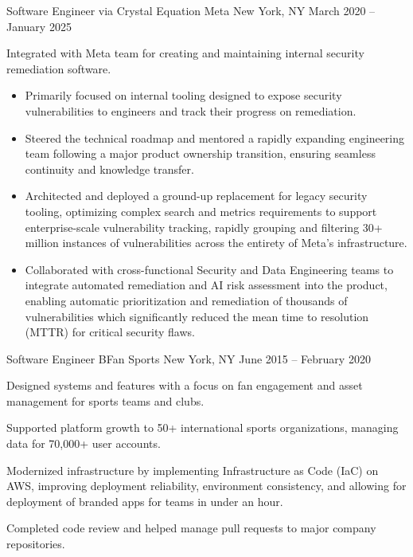 \begin{cventries}
	\cventry
		{Software Engineer via Crystal Equation} %
		{Meta} %
		{New York, NY} %
		{March 2020 – January 2025} %
		{
			\begin{cvitems} %
				\item {Integrated with Meta team for creating and maintaining internal security remediation software.}
				\begin{itemize}
					\item {Primarily focused on internal tooling designed to expose security vulnerabilities to engineers and track their progress on remediation.}
					\item {Steered the technical roadmap and mentored a rapidly expanding engineering team following a major product ownership transition, ensuring seamless continuity and knowledge transfer.}
					\item {Architected and deployed a ground-up replacement for legacy security tooling, optimizing complex search and metrics requirements to support enterprise-scale vulnerability tracking, rapidly grouping and filtering 30+ million instances of vulnerabilities across the entirety of Meta's infrastructure.}
					\item {Collaborated with cross-functional Security and Data Engineering teams to integrate automated remediation and AI risk assessment into the product, enabling automatic prioritization and remediation of thousands of vulnerabilities which significantly reduced the mean time to resolution (MTTR) for critical security flaws.}
				\end{itemize}
			\end{cvitems}
		}

	\cventry
		{Software Engineer} %
		{BFan Sports} %
		{New York, NY} %
		{June 2015 – February 2020} %
		{
			\begin{cvitems} %
				\item {Designed systems and features with a focus on fan engagement and asset management for sports teams and clubs.}
				\item {Supported platform growth to 50+ international sports organizations, managing data for 70,000+ user accounts.}
				\item {Modernized infrastructure by implementing Infrastructure as Code (IaC) on AWS, improving deployment reliability, environment consistency, and allowing for deployment of branded apps for teams in under an hour.}
				\item {Completed code review and helped manage pull requests to major company repositories.}
			\end{cvitems}
		}


\end{cventries}

